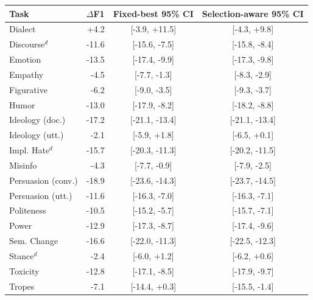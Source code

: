 \begin{tabular}{lrcc}
\toprule
Task & $\Delta$F1 & Fixed-best 95\% CI & Selection-aware 95\% CI \\
\midrule
Dialect & +4.2 & [-3.9, +11.5] & [-4.3, +9.8] \\
Discourse$^{d}$ & -11.6 & [-15.6, -7.5] & [-15.8, -8.4] \\
Emotion & -13.5 & [-17.4, -9.9] & [-17.3, -9.8] \\
Empathy & -4.5 & [-7.7, -1.3] & [-8.3, -2.9] \\
Figurative & -6.2 & [-9.0, -3.5] & [-9.3, -3.7] \\
Humor & -13.0 & [-17.9, -8.2] & [-18.2, -8.8] \\
Ideology (doc.) & -17.2 & [-21.1, -13.4] & [-21.1, -13.4] \\
Ideology (utt.) & -2.1 & [-5.9, +1.8] & [-6.5, +0.1] \\
Impl. Hate$^{d}$ & -15.7 & [-20.3, -11.3] & [-20.2, -11.5] \\
Misinfo & -4.3 & [-7.7, -0.9] & [-7.9, -2.5] \\
Persuasion (conv.) & -18.9 & [-23.6, -14.3] & [-23.7, -14.5] \\
Persuasion (utt.) & -11.6 & [-16.3, -7.0] & [-16.3, -7.1] \\
Politeness & -10.5 & [-15.2, -5.7] & [-15.7, -7.1] \\
Power & -12.9 & [-17.3, -8.7] & [-17.4, -9.6] \\
Sem. Change & -16.6 & [-22.0, -11.3] & [-22.5, -12.3] \\
Stance$^{d}$ & -2.4 & [-6.0, +1.2] & [-6.2, +0.6] \\
Toxicity & -12.8 & [-17.1, -8.5] & [-17.9, -9.7] \\
Tropes & -7.1 & [-14.4, +0.3] & [-15.5, -1.4] \\
\bottomrule
\end{tabular}
